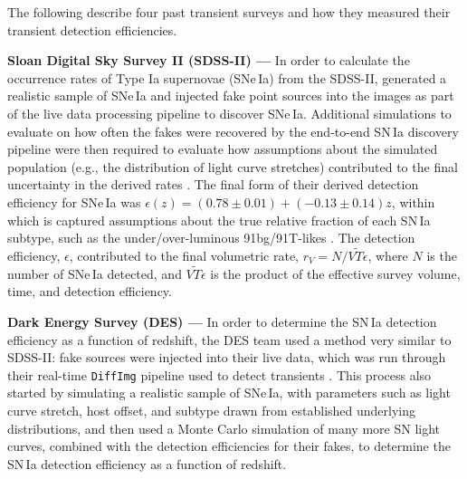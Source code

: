 \documentclass[DM,lsstdraft,toc]{lsstdoc}
\begin{document}
The following describe four past transient surveys and how they measured their transient detection efficiencies.

{\bf Sloan Digital Sky Survey II (SDSS-II) ---} In order to calculate the occurrence rates of Type Ia supernovae (SNe\,Ia) from the SDSS-II, \cite{2008AJ....135..348S} generated a realistic sample of SNe\,Ia and injected fake point sources into the images as part of the live data processing pipeline to discover SNe\,Ia. Additional simulations to evaluate on how often the fakes were recovered by the end-to-end SN\,Ia discovery pipeline were then required to evaluate how assumptions about the simulated population (e.g., the distribution of light curve stretches) contributed to the final uncertainty in the derived rates \citep{2008ApJ...682..262D}. The final form of their derived detection efficiency for SNe\,Ia was $\epsilon(z) = (0.78 \pm 0.01) + (-0.13 \pm 0.14)z$, within which is captured assumptions about the true relative fraction of each SN\,Ia subtype, such as the under/over-luminous 91bg/91T-likes \citep{2008ApJ...682..262D}. The detection efficiency, $\epsilon$, contributed to the final volumetric rate, $r_V = N / \widetilde{VT\epsilon}$, where $N$ is the number of SNe\,Ia detected, and $\widetilde{VT\epsilon}$ is the product of the effective survey volume, time, and detection efficiency.

{\bf Dark Energy Survey (DES) ---} In order to determine the SN\,Ia detection efficiency as a function of redshift, the DES team used a method very similar to SDSS-II: fake sources were injected into their live data, which was run through their real-time {\tt DiffImg} pipeline used to detect transients \cite{2015AJ....150..172K}. This process also started by simulating a realistic sample of SNe\,Ia, with parameters such as light curve stretch, host offset, and subtype drawn from established underlying distributions, and then used a Monte Carlo simulation of many more SN light curves, combined with the detection efficiencies for their fakes, to determine the SN\,Ia detection efficiency as a function of redshift.
\end{document}
